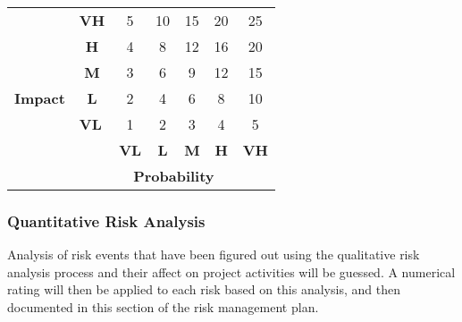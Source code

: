 \documentclass{article}
\begin{document}
\begin{itemize}
\begin{table}[h!]
\centering
\begin{tabular}{|c|c|c|c|c|c|c|}
\hline
\multirow{7}{*}{\textbf{Impact}} & \multicolumn{1}{l|}{\textbf{VH}} & \cellcolor{yellow}5           & \cellcolor{yellow}10         & \cellcolor{red}15         & \cellcolor{red}20         &\cellcolor{red} 25          \\ \cline{2-7} 
                                 & \textbf{H}                       & \cellcolor{green}4           & \cellcolor{yellow}8          & \cellcolor{yellow}12         & \cellcolor{red}16         & \cellcolor{red}20          \\ \cline{2-7} 
                                 & \textbf{M}                       & \cellcolor{green}3           & \cellcolor{yellow}6          & \cellcolor{yellow}9          &\cellcolor{yellow} 12         & \cellcolor{red}15          \\ \cline{2-7} 
                                 & \textbf{L}                       & \cellcolor{green}2           &\cellcolor{green} 4          &\cellcolor{yellow} 6          & \cellcolor{yellow}8          & \cellcolor{yellow}10          \\ \cline{2-7} 
                                 & \multicolumn{1}{l|}{\textbf{VL}} &\cellcolor{green} 1           &\cellcolor{green} 2          &\cellcolor{green} 3          & \cellcolor{green}4          & \cellcolor{yellow}5           \\ \cline{2-7} 
                                 &                                  & \textbf{VL} & \textbf{L} & \textbf{M} & \textbf{H} & \textbf{VH} \\ \cline{2-7} 
                                 & \multicolumn{6}{c|}{\textbf{Probability}}                                                           \\ \hline
\end{tabular}
\end{table}
\end{itemize}
\subsubsection{Quantitative Risk Analysis}
Analysis of risk events that have been figured out using the qualitative risk analysis process and their affect on project activities will be guessed. A numerical rating will then be applied to each risk based on this analysis, and then documented in this section of the risk management plan.
\end{document}
